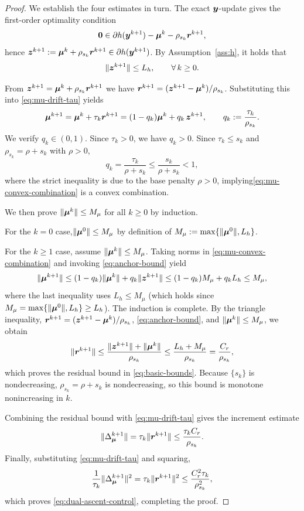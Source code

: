 \begin{proof}
We establish the four estimates in turn. The exact $\bm{y}$-update gives the first-order
optimality condition
\[
    \bm{0}\in\partial h(\bm{y}^{k+1})-\bm{\mu}^k-\rho_{s_k}\bm{r}^{k+1},
\]
hence $\bm{z}^{k+1}:=\bm{\mu}^k+\rho_{s_k}\bm{r}^{k+1}\in\partial h(\bm{y}^{k+1})$.
By Assumption~\ref{ass:h}, it holds that
\begin{equation}
    \|\bm{z}^{k+1}\|\le L_h,\qquad\forall\,k\ge0.
    \label{eq:anchor-bound}
\end{equation}

From $\bm{z}^{k+1}=\bm{\mu}^k+\rho_{s_k}\bm{r}^{k+1}$ we have
$\bm{r}^{k+1}=(\bm{z}^{k+1}-\bm{\mu}^k)/\rho_{s_k}$.  Substituting this into
\eqref{eq:mu-drift-tau} yields
\begin{equation}
    \bm{\mu}^{k+1}
    =\bm{\mu}^k+\tau_k\bm{r}^{k+1}
    =(1-q_k)\bm{\mu}^k+q_k\,\bm{z}^{k+1},
    \qquad
    q_k:=\frac{\tau_k}{\rho_{s_k}}.
    \label{eq:mu-convex-combination}
\end{equation}
We verify $q_k\in(0,1)$.  Since $\tau_k>0$, we have $q_k>0$.
Since $\tau_k\le s_k$ and $\rho_{s_k}=\rho+s_k$ with $\rho>0$,
\[
    q_k=\frac{\tau_k}{\rho+s_k}\le\frac{s_k}{\rho+s_k}<1,
\]
where the strict inequality is due to the base penalty $\rho>0$, implying\eqref{eq:mu-convex-combination} is a convex combination.

We then prove $\|\bm{\mu}^k\|\le M_\mu$ for all $k\ge0$ by induction.

For the $k=0$ case,$\|\bm{\mu}^0\|\le M_\mu$ by definition of $M_\mu:=\max\{\|\bm{\mu}^0\|,L_h\}$.

For the $k \geq 1$ case, assume $\|\bm{\mu}^k\|\le M_\mu$.  Taking norms in
\eqref{eq:mu-convex-combination} and invoking \eqref{eq:anchor-bound} yield 
\[
    \|\bm{\mu}^{k+1}\|
    \le(1-q_k)\|\bm{\mu}^k\|+q_k\|\bm{z}^{k+1}\|
    \le(1-q_k)M_\mu+q_k L_h
    \le M_\mu,
\]
where the last inequality uses $L_h\le M_\mu$ (which holds since
$M_\mu=\max\{\|\bm{\mu}^0\|,L_h\}\ge L_h$).  The induction is complete. By the triangle inequality, $\bm{r}^{k+1}=(\bm{z}^{k+1}-\bm{\mu}^k)/\rho_{s_k}$, 
\eqref{eq:anchor-bound}, and $\|\bm{\mu}^k\|\le M_\mu$, we obtain 
\[
    \|\bm{r}^{k+1}\|
    \le\frac{\|\bm{z}^{k+1}\|+\|\bm{\mu}^k\|}{\rho_{s_k}}
    \le\frac{L_h+M_\mu}{\rho_{s_k}}
    =\frac{C_r}{\rho_{s_k}},
\]
which proves the residual bound in \eqref{eq:basic-bounds}.  Because $\{s_k\}$ is nondecreasing, $\rho_{s_k}=\rho+s_k$ is nondecreasing, so
this bound is monotone nonincreasing in $k$.

Combining the residual bound with \eqref{eq:mu-drift-tau} gives the
increment estimate
\[
    \|\Delta_{\bm{\mu}}^{k+1}\|
    =\tau_k\|\bm{r}^{k+1}\|
    \le\frac{\tau_k C_r}{\rho_{s_k}}.
\]
Finally, substituting \eqref{eq:mu-drift-tau} and squaring,
\[
    \frac{1}{\tau_k}\|\Delta_{\bm{\mu}}^{k+1}\|^2
    =\tau_k\|\bm{r}^{k+1}\|^2
    \le\frac{C_r^2\tau_k}{\rho_{s_k}^2},
\]
which proves \eqref{eq:dual-ascent-control}, completing the proof.
\end{proof}


